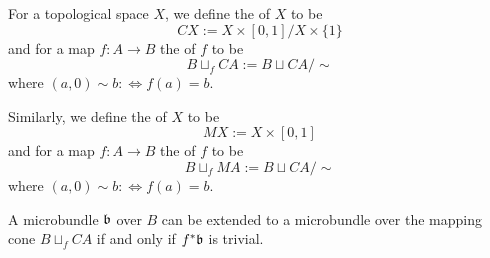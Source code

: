 
For a topological space $X$, we define the  of $X$ to be 
\[ CX := X \times [0, 1] / X \times \{1\} \]
and for a map $f: A \to B$ the  of $f$ to be
\[ B \sqcup_f CA := B \sqcup CA / \sim \]
where $(a, 0) \sim b :\iff f(a) = b$.

Similarly, we define the  of $X$ to be
\[ MX := X \times [0, 1] \]
and for a map $f: A \to B$ the  of $f$ to be
\[ B \sqcup_f MA := B \sqcup CA / \sim \]
where $(a, 0) \sim b :\iff f(a) = b$.

\begin{mylemma}
A microbundle $\mathfrak{b}$ over $B$ can be extended to a microbundle over the mapping cone $B \sqcup_f CA$ if and only if $f^*\mathfrak{b}$ is trivial.
\end{mylemma}
